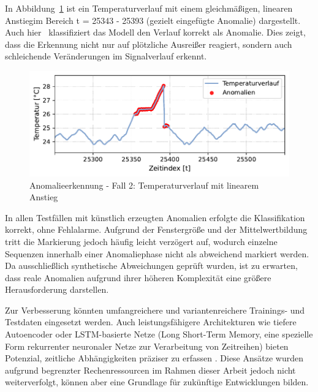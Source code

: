 In Abbildung~\ref{fig:Fall2} ist ein Temperaturverlauf mit einem gleichmäßigen, linearen Anstiegim Bereich t = 25343 - 25393 (gezielt eingefügte Anomalie) dargestellt. 
Auch hier%
\pagebreak
~klassifiziert das Modell den Verlauf korrekt als Anomalie. 
Dies zeigt, dass die Erkennung nicht nur auf plötzliche Ausreißer reagiert, sondern auch schleichende Veränderungen im Signalverlauf erkennt.

\vspace{-0.75em}
\begin{figure}[htbp]
    \centering
        \includegraphics[width=1\textwidth]{Bilder/Ergebnisse/KI/Fall2.pdf}
        \vspace{-2em}
    \caption{Anomalieerkennung - Fall 2: Temperaturverlauf mit linearem Anstieg}
    \label{fig:Fall2}
\end{figure}
\vspace{-0.75em}

In allen Testfällen mit künstlich erzeugten Anomalien erfolgte die Klassifikation korrekt, ohne Fehlalarme. 
Aufgrund der Fenstergröße und der Mittelwertbildung tritt die Markierung jedoch häufig leicht verzögert auf, wodurch einzelne Sequenzen innerhalb einer Anomaliephase nicht als abweichend markiert werden. 
Da ausschließlich synthetische Abweichungen geprüft wurden, ist zu erwarten, dass reale Anomalien aufgrund ihrer höheren Komplexität eine größere Herausforderung darstellen.

Zur Verbesserung könnten umfangreichere und variantenreichere Trainings- und Testdaten eingesetzt werden. 
Auch leistungsfähigere Architekturen wie tiefere Autoencoder oder LSTM-basierte Netze (Long Short-Term Memory, eine spezielle Form rekurrenter neuronaler Netze zur Verarbeitung von Zeitreihen) bieten Potenzial, zeitliche Abhängigkeiten präziser zu erfassen \cite{MALEKI2021107443}. 
Diese Ansätze wurden aufgrund begrenzter Rechenressourcen im Rahmen dieser Arbeit jedoch nicht weiterverfolgt, können aber eine Grundlage für zukünftige Entwicklungen bilden.

